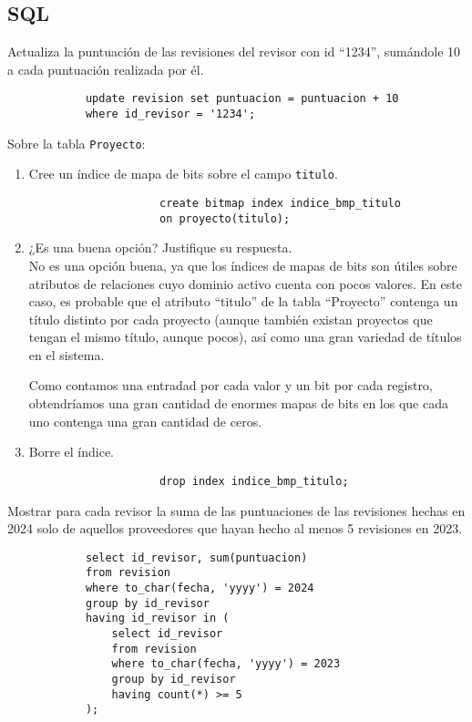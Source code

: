 \documentclass[12pt]{article}
\begin{document}
    \subsection*{SQL}
    \begin{ejercicio}
        Actualiza la puntuación de las revisiones del revisor con id ``1234'', sumándole 10 a cada puntuación realizada por él.
        \begin{verbatim}
            update revision set puntuacion = puntuacion + 10
            where id_revisor = '1234';
        \end{verbatim}
    \end{ejercicio}
    \begin{ejercicio}
        Sobre la tabla \verb|Proyecto|:
        \begin{enumerate}[label=\alph*)]
            \item Cree un índice de mapa de bits sobre el campo \verb|titulo|.
                \begin{verbatim}
                    create bitmap index indice_bmp_titulo
                    on proyecto(titulo);
                \end{verbatim}
            \item ¿Es una buena opción? Justifique su respuesta.\\
                No es una opción buena, ya que los índices de mapas de bits son útiles sobre atributos de relaciones cuyo dominio activo cuenta con pocos valores. En este caso, es probable que el atributo ``titulo'' de la tabla ``Proyecto'' contenga un título distinto por cada proyecto (aunque también existan proyectos que tengan el mismo título, aunque pocos), así como una gran variedad de títulos en el sistema.

                Como contamos una entradad por cada valor y un bit por cada registro, obtendríamos una gran cantidad de enormes mapas de bits en los que cada uno contenga una gran cantidad de ceros.
            \item Borre el índice.
                \begin{verbatim}
                    drop index indice_bmp_titulo;
                \end{verbatim}
        \end{enumerate}
    \end{ejercicio}
    \begin{ejercicio}
        Mostrar para cada revisor la suma de las puntuaciones de las revisiones hechas en 2024 solo de aquellos proveedores que hayan hecho al menos 5 revisiones en 2023.
        \begin{verbatim}
            select id_revisor, sum(puntuacion)
            from revision
            where to_char(fecha, 'yyyy') = 2024
            group by id_revisor
            having id_revisor in (
                select id_revisor
                from revision
                where to_char(fecha, 'yyyy') = 2023
                group by id_revisor
                having count(*) >= 5
            );
        \end{verbatim}    
    \end{ejercicio}
\end{document}
